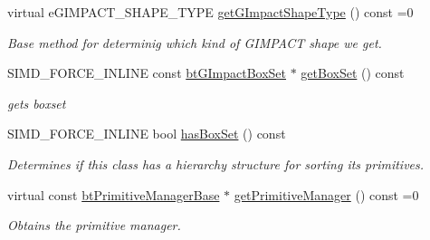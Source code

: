 \textbf{ }\par
\begin{DoxyCompactItemize}
\item 
virtual e\+G\+I\+M\+P\+A\+C\+T\+\_\+\+S\+H\+A\+P\+E\+\_\+\+T\+Y\+PE \hyperlink{classbtGImpactShapeInterface_a25cacbe448997e3f8ec99cb2d4952859}{get\+G\+Impact\+Shape\+Type} () const =0
\begin{DoxyCompactList}\small\item\em Base method for determinig which kind of G\+I\+M\+P\+A\+CT shape we get. \end{DoxyCompactList}\item 
\mbox{\label{classbtGImpactShapeInterface_a31751779f73b98bca7ea116cb3b07e13}} 
S\+I\+M\+D\+\_\+\+F\+O\+R\+C\+E\+\_\+\+I\+N\+L\+I\+NE const \hyperlink{classbtGImpactQuantizedBvh}{bt\+G\+Impact\+Box\+Set} $\ast$ \hyperlink{classbtGImpactShapeInterface_a31751779f73b98bca7ea116cb3b07e13}{get\+Box\+Set} () const
\begin{DoxyCompactList}\small\item\em gets boxset \end{DoxyCompactList}\item 
\mbox{\label{classbtGImpactShapeInterface_af8cc682e76969583dc5636079081e63c}} 
S\+I\+M\+D\+\_\+\+F\+O\+R\+C\+E\+\_\+\+I\+N\+L\+I\+NE bool \hyperlink{classbtGImpactShapeInterface_af8cc682e76969583dc5636079081e63c}{has\+Box\+Set} () const
\begin{DoxyCompactList}\small\item\em Determines if this class has a hierarchy structure for sorting its primitives. \end{DoxyCompactList}\item 
\mbox{\label{classbtGImpactShapeInterface_a291328e80a5f22cffc50924ebb90040a}} 
virtual const \hyperlink{classbtPrimitiveManagerBase}{bt\+Primitive\+Manager\+Base} $\ast$ \hyperlink{classbtGImpactShapeInterface_a291328e80a5f22cffc50924ebb90040a}{get\+Primitive\+Manager} () const =0
\begin{DoxyCompactList}\small\item\em Obtains the primitive manager. \end{DoxyCompactList}\item 
\mbox{\label{classbtGImpactShapeInterface_aa145ed4669ce202e97d1a9e1081b3560}} 

\end{DoxyCompactItemize}
